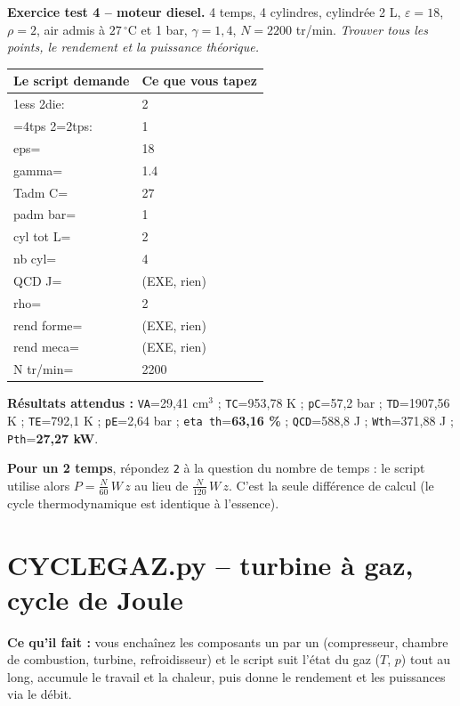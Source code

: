 \documentclass[10.5pt,a4paper]{article}
\makeatletter
\newenvironment{saisie}{%
\begin{center}\small
\begin{tabular}{@{}>{\ttfamily}l l@{}}
\toprule
\textrm{\textbf{Le script demande}} & \textbf{Ce que vous tapez} \\
\midrule
}{%
\bottomrule
\end{tabular}
\end{center}
}
\makeatother
\begin{document}
\begin{test}
\textbf{Exercice test 4 -- moteur diesel.} 4 temps, 4 cylindres, cylindrée 2 L, $\varepsilon=18$,
$\rho=2$, air admis à $27\,^\circ$C et 1 bar, $\gamma=1{,}4$, $N=2200$ tr/min.
\emph{Trouver tous les points, le rendement et la puissance théorique.}

\begin{saisie}
1ess 2die: & 2 \\
1=4tps 2=2tps: & 1 \\
eps= & 18 \\
gamma= & 1.4 \\
Tadm C= & 27 \\
padm bar= & 1 \\
cyl tot L= & 2 \\
nb cyl= & 4 \\
QCD J= & \textrm{(EXE, rien)} \\
rho= & 2 \\
rend forme= & \textrm{(EXE, rien)} \\
rend meca= & \textrm{(EXE, rien)} \\
N tr/min= & 2200 \\
\end{saisie}

\textbf{Résultats attendus :} \texttt{VA}=29,41 cm$^3$ ; \texttt{TC}=953,78 K ; \texttt{pC}=57,2 bar ;
\texttt{TD}=1907,56 K ; \texttt{TE}=792,1 K ; \texttt{pE}=2,64 bar ;
\texttt{eta th}=\textbf{63,16 \%} ; \texttt{QCD}=588,8 J ; \texttt{Wth}=371,88 J ;
\texttt{Pth}=\textbf{27,27 kW}.
\end{test}

\begin{piege}
\textbf{Pour un 2 temps}, répondez \texttt{2} à la question du nombre de temps : le script utilise alors
$P=\frac{N}{60}\,W\,z$ au lieu de $\frac{N}{120}\,W\,z$. C'est la seule différence de calcul (le cycle
thermodynamique est identique à l'essence).
\end{piege}

\newpage
\section{CYCLEGAZ.py -- turbine à gaz, cycle de Joule}

\begin{objectif}
\textbf{Ce qu'il fait :} vous enchaînez les composants un par un (compresseur, chambre de combustion,
turbine, refroidisseur) et le script suit l'état du gaz ($T$, $p$) tout au long, accumule le travail et
la chaleur, puis donne le rendement et les puissances via le débit.
\end{objectif}
\end{document}
